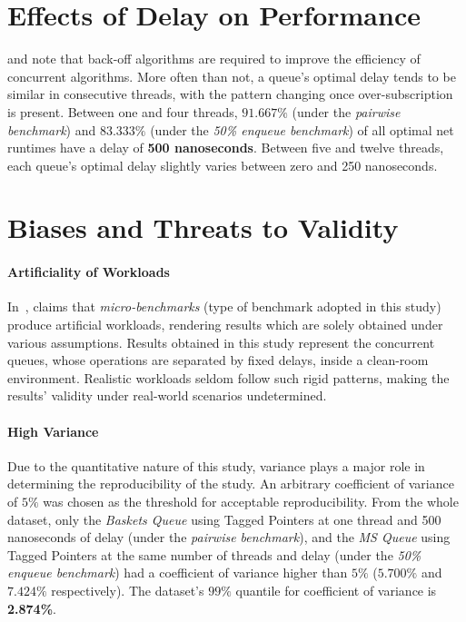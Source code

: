 \section{Effects of Delay on Performance}
\citeauthor{valois1995datastructures} and \citeauthor{hoffman2007baskets}
\citep{valois1995datastructures,hoffman2007baskets} note that back-off
algorithms are required to improve the efficiency of concurrent algorithms.
More often than not, a queue's optimal delay tends to be similar in consecutive
threads, with the pattern changing once over-subscription is present. Between
one and four threads, \textbf{$91.667\%$} (under the \emph{pairwise benchmark})
and \textbf{$83.333\%$} (under the \emph{50\% enqueue benchmark}) of all optimal net
runtimes have a delay of \textbf{500 nanoseconds}. Between five and twelve threads,
each queue's optimal delay slightly varies between zero and 250 nanoseconds. 


\section{Biases and Threats to Validity}
\paragraph{Artificiality of Workloads}
In~\citep{gregg2014systems}, \citeauthor{gregg2014systems} claims that
\emph{micro-benchmarks} (type of benchmark adopted in this study) produce
artificial workloads, rendering results which are  solely obtained under
various assumptions. Results obtained in this study represent the concurrent
queues, whose operations are separated by fixed delays, inside a clean-room
environment. Realistic workloads seldom follow such rigid patterns, making the
results' validity under real-world scenarios undetermined.

\paragraph{High Variance} Due to the quantitative nature of this study,
variance plays a major role in determining the reproducibility of the study. An
arbitrary coefficient of variance of $5\%$ was chosen as the threshold for
acceptable reproducibility. From the whole dataset, only the \emph{Baskets Queue} using Tagged Pointers at
one thread and 500 nanoseconds of delay (under the \emph{pairwise benchmark}), and
the \emph{MS Queue} using Tagged Pointers at the same number of threads and
delay (under the \emph{50\% enqueue benchmark}) had a coefficient of variance
higher than $5\%$ ($5.700\%$ and $7.424\%$ respectively). The dataset's $99\%$
quantile for coefficient of variance is \textbf{2.874\%}.

